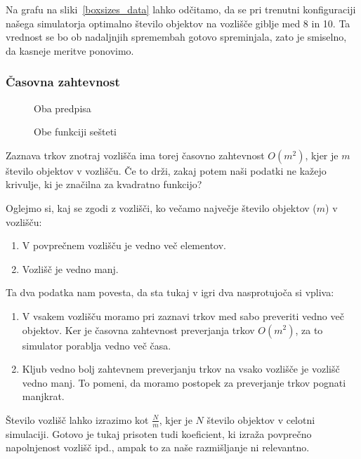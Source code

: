 \documentclass[a4paper,12pt]{article}
\begin{document}
Na grafu na sliki~\ref{boxsizes_data} lahko odčitamo, da se pri trenutni konfiguraciji našega simulatorja optimalno število
objektov na vozlišče giblje med 8 in 10. Ta vrednost se bo ob nadaljnjih spremembah gotovo spreminjala, zato je
smiselno, da kasneje meritve ponovimo.
\newpage
\subsubsection{Časovna zahtevnost}

\begin{figure}
    \caption{Oba predpisa}
    \vspace{1cm}
    \caption{Obe funkciji sešteti}
\end{figure}

Zaznava trkov znotraj vozlišča ima torej časovno zahtevnost $O(m^2)$, kjer je $m$ število objektov v vozlišču.
Če to drži, zakaj potem naši podatki ne kažejo krivulje, ki je značilna za kvadratno funkcijo?

Oglejmo si, kaj se zgodi z vozlišči, ko večamo največje število objektov ($m$) v vozlišču:
\begin{enumerate}
    \item V povprečnem vozlišču je vedno več elementov.
    \item Vozlišč je vedno manj.
\end{enumerate} 

Ta dva podatka nam povesta, da sta tukaj v igri dva nasprotujoča si vpliva:
\begin{enumerate}

    \item V vsakem vozlišču moramo pri zaznavi trkov med sabo preveriti vedno več objektov.
Ker je časovna zahtevnost preverjanja trkov $ O(m^2)$, za to simulator porablja vedno več časa.

    \item Kljub vedno bolj zahtevnem preverjanju trkov na vsako vozlišče je vozlišč vedno manj. To pomeni,
da moramo postopek za preverjanje trkov pognati manjkrat.
\end{enumerate} 

Število vozlišč lahko izrazimo kot {\small$ \frac{N}{m} $}, kjer je $N$ število objektov v celotni simulaciji.
Gotovo je tukaj prisoten tudi koeficient, ki izraža povprečno napolnjenost vozlišč ipd., ampak to za naše
razmišljanje ni relevantno.
\end{document}
